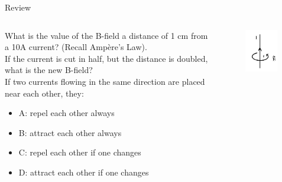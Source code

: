 \documentclass{beamer}
\begin{document}
\begin{frame}{Review}
\begin{columns}[T]
\begin{column}{0.65\textwidth}
\small
What is the value of the B-field a distance of 1 cm from a 10A current? (Recall Amp\`{e}re's Law). \\ \vspace{0.5cm}
If the current is cut in half, but the distance is doubled, what is the new B-field? \\ \vspace{0.5cm}
If two currents flowing in the same direction are placed near each other, they:
\begin{itemize}
\item A: repel each other always
\item B: attract each other always
\item C: repel each other if one changes
\item D: attract each other if one changes
\end{itemize}
\end{column}
\begin{column}{0.35\textwidth}
\begin{figure}
\centering
\includegraphics[width=0.95\textwidth]{ex5.png}
\caption{\label{fig:ex5}}
\end{figure}
\end{column}
\end{columns}
\end{frame}
\end{document}
